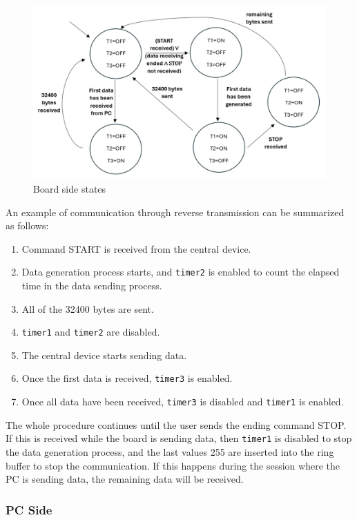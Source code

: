 \documentclass{Configuration_Files/PoliMi3i_thesis}
\begin{document}
\begin{figure}[H]
    \centering
    \includegraphics[scale=0.6]{Board Windows PC/Screenshot 2024-09-15 at 18.19.45.png}
    \caption{Board side states}
    \label{boardwindows_10}
\end{figure}

An example of communication through reverse transmission can be summarized as follows:

\begin{enumerate}
    \item Command START is received from the central device.
    \item Data generation process starts, and \texttt{timer2} is enabled to count the elapsed time in the data sending process.
    \item All of the 32400 bytes are sent.
    \item \texttt{timer1} and \texttt{timer2} are disabled.
    \item The central device starts sending data.
    \item Once the first data is received, \texttt{timer3} is enabled.
    \item Once all data have been received, \texttt{timer3} is disabled and \texttt{timer1} is enabled.
\end{enumerate}

The whole procedure continues until the user sends the ending command STOP. If this is received while the board is sending data, then \texttt{timer1} is disabled to stop the data generation process, and the last values 255 are inserted into the ring buffer to stop the communication. If this happens during the session where the PC is sending data, the remaining data will be received.

\subsubsection{PC Side}
\end{document}
